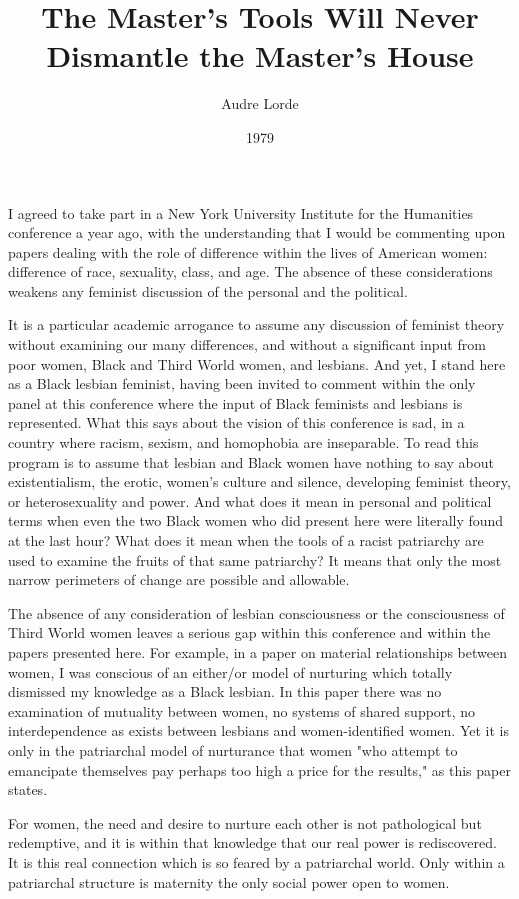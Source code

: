 \documentclass{article}
\title{The Master's Tools Will Never Dismantle the Master's House}
\author{Audre Lorde}
\date{1979}
\begin{document}
\maketitle

I agreed to take part in a New York University Institute for the Humanities conference a year ago, with the understanding that I would be commenting upon papers dealing with the role of difference within the lives of American women: difference of race, sexuality, class, and age. The absence of these considerations weakens any feminist discussion of the personal and the political. 

It is a particular academic arrogance to assume any discussion of feminist theory without examining our many differences, and without a significant input from poor women, Black and Third World women, and lesbians. And yet, I stand here as a Black lesbian feminist, having been invited to comment within the only panel at this conference where the input of Black feminists and lesbians is represented. What this says about the vision of this conference is sad, in a country where racism, sexism, and homophobia are inseparable. To read this program is to assume that lesbian and Black women have nothing to say about existentialism, the erotic, women's culture and silence, developing feminist theory, or heterosexuality and power. And what does it mean in personal and political terms when even the two Black women who did present here were literally found at the last hour? What does it mean when the tools of a racist patriarchy are used to examine the fruits of that same patriarchy? It means that only the most narrow perimeters of change are possible and allowable. 

The absence of any consideration of lesbian consciousness or the consciousness of Third World women leaves a serious gap within this conference and within the papers presented here. For example, in a paper on material relationships between women, I was conscious of an either/or model of nurturing which totally dismissed my knowledge as a Black lesbian. In this paper there was no examination of mutuality between women, no systems of shared support, no interdependence as exists between lesbians and women-identified women. Yet it is only in the patriarchal model of nurturance that women "who attempt to emancipate themselves pay perhaps too high a price for the results," as this paper states. 

For women, the need and desire to nurture each other is not pathological but redemptive, and it is within that knowledge that our real power is rediscovered. It is this real connection which is so feared by a patriarchal world. Only within a patriarchal structure is maternity the only social power open to women. 
\end{document}
